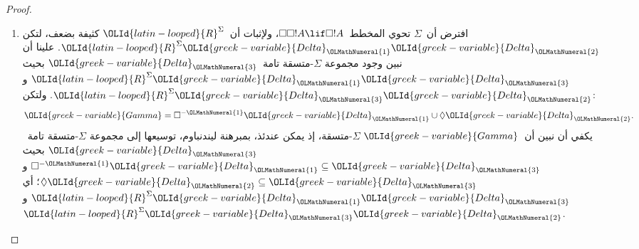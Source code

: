 \documentclass[../../../include/open-logic-section]{subfiles}
\begin{document}
\begin{proof}
\begin{enumerate}
  \item افترض أن~$\Sigma$ تحوي المخطط~$\Box\Box!A \lif \Box!A$،
    ولإثبات أن~${\OLId{latin-looped}{R}}^\Sigma$ كثيفة بضعف، لتكن
    ${\OLId{latin-looped}{R}}^\Sigma {\OLId{greek-variable}{Delta}}_{\OLMathNumeral{1}}{\OLId{greek-variable}{Delta}}_{\OLMathNumeral{2}}$. علينا أن نبين وجود مجموعة
    $\Sigma$-متسقة تامة~${\OLId{greek-variable}{Delta}}_{\OLMathNumeral{3}}$ بحيث
    ${\OLId{latin-looped}{R}}^\Sigma {\OLId{greek-variable}{Delta}}_{\OLMathNumeral{1}}{\OLId{greek-variable}{Delta}}_{\OLMathNumeral{3}}$ و${\OLId{latin-looped}{R}}^\Sigma {\OLId{greek-variable}{Delta}}_{\OLMathNumeral{3}}{\OLId{greek-variable}{Delta}}_{\OLMathNumeral{2}}$. ولتكن:
    \[
    {\OLId{greek-variable}{Gamma}} = \Box^{-{\OLMathNumeral{1}}}{\OLId{greek-variable}{Delta}}_{\OLMathNumeral{1}} \cup \Diamond{\OLId{greek-variable}{Delta}}_{\OLMathNumeral{2}}.
    \]
    يكفي أن نبين أن~${\OLId{greek-variable}{Gamma}}$ $\Sigma$-متسقة، إذ يمكن عندئذ، بمبرهنة
    ليندنباوم، توسيعها إلى مجموعة $\Sigma$-متسقة تامة~${\OLId{greek-variable}{Delta}}_{\OLMathNumeral{3}}$ بحيث
    $\Box^{-{\OLMathNumeral{1}}}{\OLId{greek-variable}{Delta}}_{\OLMathNumeral{1}} \subseteq {\OLId{greek-variable}{Delta}}_{\OLMathNumeral{3}}$ و
    $\Diamond{\OLId{greek-variable}{Delta}}_{\OLMathNumeral{2}} \subseteq {\OLId{greek-variable}{Delta}}_{\OLMathNumeral{3}}$؛ أي
    ${\OLId{latin-looped}{R}}^\Sigma {\OLId{greek-variable}{Delta}}_{\OLMathNumeral{1}}{\OLId{greek-variable}{Delta}}_{\OLMathNumeral{3}}$ و
    ${\OLId{latin-looped}{R}}^\Sigma {\OLId{greek-variable}{Delta}}_{\OLMathNumeral{3}}{\OLId{greek-variable}{Delta}}_{\OLMathNumeral{2}}$.


\end{enumerate}
\end{proof}
\end{document}
